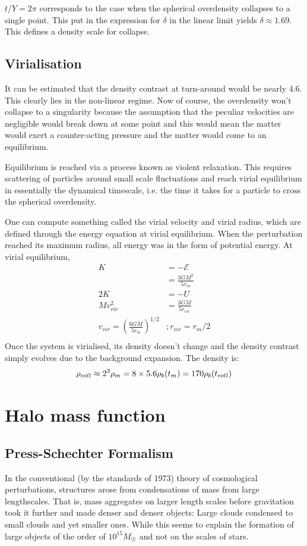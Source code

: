 \documentclass[12pt,a4paper,twoside]{book}
\begin{document}
			$t/Y=2\pi$ corresponds to the case when the spherical overdensity collapses to a single point. This put in the expression for $\delta$ in the linear limit yields $\delta\approx1.69$. This defines a density scale for collapse.
			
		\subsection{Virialisation}
			It can be estimated that the density contrast at turn-around would be nearly 4.6. This clearly lies in the non-linear regime. Now of course, the overdensity won't collapse to a singularity because the assumption that the peculiar velocities are negligible would break down at some point and this would mean the matter would exert a counter-acting pressure and the matter would come to an equilibrium.
			
			Equilibrium is reached via a process known as violent relaxation. This requires scattering of particles around small scale fluctuations and reach virial equilibrium in essentially the dynamical timescale, i.e. the time it takes for a particle to cross the spherical overdensity.
			
			One can compute something called the virial velocity and virial radius, which are defined through the energy equation at virial equilibrium. When the perturbation reached its maximum radius, all energy was in the form of potential energy. At virial equilibrium,
			$$
				\begin{aligned}
					K&=-\mathcal{E}\\
					 &=\frac{3GM^2}{5r_m}\\
				   2K&=-U\\
				   Mv_{vir}^2&=\frac{3GM}{5r_{vir}}\\
					v_{vir}=\left(\frac{6GM}{5r_m}\right)^{1/2}&;
					r_{vir}=r_m/2\\
				\end{aligned}
			$$
			Once the system is virialised, its density doesn't change and the density contrast simply evolves due to the background expansion. The density is:
			$$
				\rho_{coll}\approx 2^3\rho_m=8\times5.6\rho_b(t_{m})=170\rho_b(t_{coll})\\
			$$
	\section{Halo mass function}
		\subsection{Press-Schechter Formalism}
			In the conventional (by the standards of 1973) theory of cosmological perturbations,	structures arose from condensations of mass from large lengthscales. That is, mass aggregates on larger length scales before gravitation took it further and made denser and denser objects: Large clouds condensed to small clouds and yet smaller ones. While this seems to explain the formation of large objects of the order of $10^{15}M_\Sun$ and not on the scales of stars.
			
\end{document}
